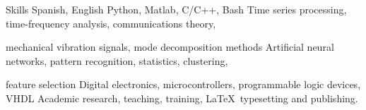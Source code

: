 
\begin{rubric}{Skills}
\entry*[Languages]
	Spanish, English
    Python, Matlab, C/C++, Bash
{}
    Time series processing, time-frequency analysis, communications theory, 
    
    mechanical vibration signals, mode decomposition methods
 Artificial neural networks, pattern recognition, statistics, clustering, 

feature selection
\entry*[Electronics]
    Digital electronics, microcontrollers, programmable logic devices,
    VHDL
\entry*[Misc.]
	Academic research, teaching, training, \LaTeX\ typesetting and publishing.
\end{rubric}
